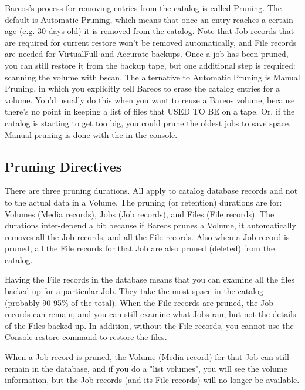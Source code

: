 Bareos's process for removing entries from the catalog is called Pruning.  The
default is Automatic Pruning, which means that once an entry reaches a certain
age (e.g.  30 days old) it is removed from the catalog. Note that Job records
that are required for current restore won't be removed automatically, and File
records are needed for VirtualFull and Accurate backups. Once a job has been
pruned, you can still restore it from the backup tape, but one additional step
is required: scanning the volume with bscan.  The alternative to Automatic
Pruning is Manual Pruning, in which you explicitly tell Bareos to erase the
catalog entries for a volume.  You'd usually do this when you want to reuse a
Bareos volume, because there's no point in keeping a list of files that USED TO
BE on a tape.  Or, if the catalog is starting to get too big, you could prune
the oldest jobs to save space.  Manual pruning is done with the  in the console.

\subsection{Pruning Directives}

There are three pruning durations. All apply to catalog database records and
not to the actual data in a Volume. The pruning (or retention) durations are
for: Volumes (Media records), Jobs (Job records), and Files (File records).
The durations inter-depend a bit because if Bareos prunes a Volume, it
automatically removes all the Job records, and all the File records. Also when
a Job record is pruned, all the File records for that Job are also pruned
(deleted) from the catalog.

Having the File records in the database means that you can examine all the
files backed up for a particular Job. They take the most space in the catalog
(probably 90-95\% of the total). When the File records are pruned, the Job
records can remain, and you can still examine what Jobs ran, but not the
details of the Files backed up. In addition, without the File records, you
cannot use the Console restore command to restore the files.

When a Job record is pruned, the Volume (Media record) for that Job can still
remain in the database, and if you do a "list volumes", you will see the
volume information, but the Job records (and its File records) will no longer
be available.

